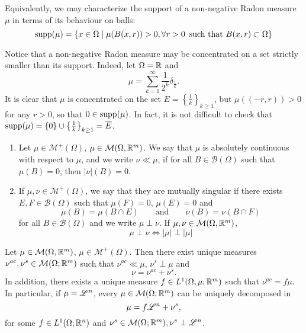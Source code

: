 \begin{exercise}
Equivalently, we may characterize the support of a non-negative Radon measure $\mu$ in terms of its behaviour on balls:
\[
\operatorname{supp} (\mu) = \{x \in \Omega \mid \mu(B(x,r)) > 0, \forall r > 0 \, \text{ such that } B(x,r) \subset \Omega\}
\]
\end{exercise}

\begin{remark}
Notice that a non-negative Radon measure may be concentrated on a set strictly smaller than its support. Indeed, let $\Omega = \mathbb{R}$ and $$\mu = \sum_{k = 1}^{\infty} \frac{1}{2^{k}} \delta_{\frac{1}{k}}.$$
It is clear that $\mu$ is concentrated on the set $E = \left \{ \frac{1}{k}\right \}_{k \ge 1}$, but $\mu((-r, r)) > 0$ for any $r> 0$, so that $0 \in \operatorname{supp}(\mu)$. In fact, it is not difficult to check that $\operatorname{supp}(\mu) = \{0\} \cup \left \{ \frac{1}{k}\right \}_{k \ge 1} = \overline{E}$. 
\end{remark}

\begin{definition}
\begin{enumerate}[1.]
\item Let $\mu \in \mathcal{M}^+(\Omega)$, $\mu \in \mathcal{M}(\Omega,\mathbb{R}^m)$. We say
that $\mu$ is absolutely continuous with respect to $\mu$, and we write $\nu \ll \mu$, if
for all $B \in \mathcal{B}(\Omega)$ such that $\mu(B) = 0$, then $|\nu|(B) = 0$.
\item If $\mu,\nu \in \mathcal{M}^+(\Omega)$, we say that they are mutually
singular if there exists $E,F \in \mathcal{B}(\Omega)$ such that $\mu(F) =0$,
$\mu(E) = 0$ and 
\[
\mu(B) = \mu (B\cap E) \qquad \text{and} \qquad
\nu(B) = \nu(B \cap F)
\]
for all $B \in \mathcal{B}(\Omega)$ and we write $\mu \perp \nu$. If $\mu,\nu
\in \mathcal{M}(\Omega,\mathbb{R}^m)$, 
\[
\mu \perp \nu \iff |\mu| \perp |\mu|
\]
\end{enumerate}
\end{definition}

\begin{theorem} \label{thm:Radon_Nikodym}
Let $\mu \in \mathcal{M}(\Omega,\mathbb{R}^m)$, $\mu \in \mathcal{M}^+(\Omega)$. Then
there exist unique measures $\nu^{ac},\nu^{s} \in \mathcal{M}(\Omega; \mathbb{R}^m)$ such
that $\nu^{ac} \ll \mu$, $\nu^s \perp \mu$ and 
\begin{equation} \label{eq:Leb_decomp}
\nu = \nu^{ac} + \nu^s. 
\end{equation}
In addition, there exists a unique measure $f\in L^1(\Omega,\mu;\mathbb{R}^m)$ such that
$\nu^{ac} = f\mu$.
\\
In particular, if $\mu = \mathscr{L}^{n}$, every $\mu \in \mathcal{M}(\Omega;\mathbb{R}^m)$ can be
uniquely decomposed in
\[
\mu = f \mathscr{L}^{n} + \nu^s, 
\]
for some $f\in L^1(\Omega; \mathbb{R}^n)$ and $\nu^s \in \mathcal{M}(\Omega;\mathbb{R}^m), \nu^s \perp \mathscr{L}^{n}$.
\end{theorem}

